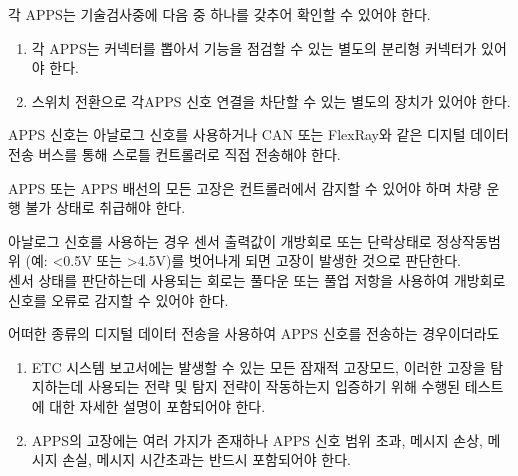 \documentclass[final,a4paper,10pt]{report}
\begin{document}
\begin{enumerate}
\begin{enumerate}
{      \item\label{rule:formula-technical.electronic-throttle-control.apps.inspection-disconnect} 각 APPS는 기술검사중에 다음 중 하나를 갖추어 확인할 수 있어야 한다.
        \begin{enumerate}
          \item\label{rule:formula-technical.electronic-throttle-control.apps.inspection-disconnect.dedicated-connector} 각 APPS는 커넥터를 뽑아서 기능을 점검할 수 있는 별도의 분리형 커넥터가 있어야 한다.
          \item\label{rule:formula-technical.electronic-throttle-control.apps.inspection-disconnect.switch-box} 스위치 전환으로 각APPS 신호 연결을 차단할 수 있는 별도의 장치가 있어야 한다.
        \end{enumerate}

      \item\label{rule:formula-technical.electronic-throttle-control.apps.direct-signal-transmission} APPS 신호는 아날로그 신호를 사용하거나 CAN 또는 FlexRay와 같은 디지털 데이터 전송 버스를 통해 스로틀 컨트롤러로 직접 전송해야 한다.
      \item\label{rule:formula-technical.electronic-throttle-control.apps.fault-triggers-inoperable-state} APPS 또는 APPS 배선의 모든 고장은 컨트롤러에서 감지할 수 있어야 하며 차량 운행 불가 상태로 취급해야 한다.
      \item\label{rule:formula-technical.electronic-throttle-control.apps.analog-fault-detection} 아날로그 신호를 사용하는 경우 센서 출력값이 개방회로 또는 단락상태로 정상작동범위 (예: <0.5V 또는 >4.5V)를 벗어나게 되면 고장이 발생한 것으로 판단한다. \\
        센서 상태를 판단하는데 사용되는 회로는 풀다운 또는 풀업 저항을 사용하여 개방회로 신호를 오류로 감지할 수 있어야 한다.

      \item\label{rule:formula-technical.electronic-throttle-control.apps.digital-fault-handling} 어떠한 종류의 디지털 데이터 전송을 사용하여 APPS 신호를 전송하는 경우이더라도
        \begin{enumerate}
          \item\label{rule:formula-technical.electronic-throttle-control.apps.digital-fault-handling.failure-modes-in-etcsf} ETC 시스템 보고서에는 발생할 수 있는 모든 잠재적 고장모드, 이러한 고장을 탐지하는데 사용되는 전략 및 탐지 전략이 작동하는지 입증하기 위해 수행된 테스트에 대한 자세한 설명이 포함되어야 한다.
          \item\label{rule:formula-technical.electronic-throttle-control.apps.digital-fault-handling.minimum-failure-modes} APPS의 고장에는 여러 가지가 존재하나 APPS 신호 범위 초과, 메시지 손상, 메시지 손실, 메시지 시간초과는 반드시 포함되어야 한다.
        \end{enumerate}

}
\end{enumerate}
\end{enumerate}
\end{document}
